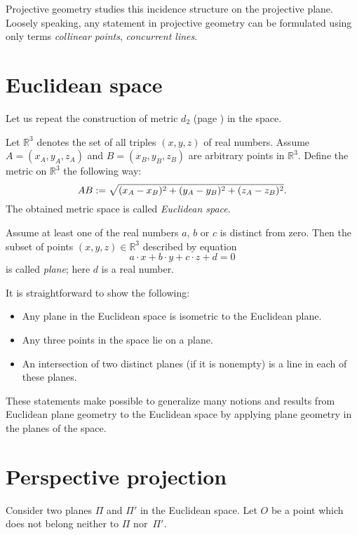 Projective geometry studies this incidence structure on the projective plane.
Loosely speaking, any statement in projective geometry can be formulated using only terms {}\emph{collinear points},
\emph{concurrent lines}.



\section*{Euclidean space}

Let us repeat the construction of metric $d_2$ (page 
\pageref{def:d_2}) in the space.

Let $\mathbb{R}^3$ denotes the set of all triples $(x,y,z)$ of real numbers.
Assume $A=(x_A,y_A,z_A)$ and $B=(x_B,y_B,z_B)$ are arbitrary points in $\mathbb{R}^3$.
Define the metric on $\mathbb{R}^3$ the following way:
$$AB
:=
\sqrt{(x_A-x_B)^2+(y_A-y_B)^2+(z_A-z_B)^2}.$$
The obtained metric space is called \emph{Euclidean space}.

Assume at least one of the real numbers $a$, $b$ or $c$ is distinct from zero.
Then the subset of points $(x,y,z)\in\mathbb{R}^3$ 
described by equation
$$a\cdot x+b\cdot y+c\cdot z+d=0$$ 
is called \emph{plane};
here $d$ is a real number.

It is straightforward to show the following:
\begin{itemize}
 \item Any plane in the Euclidean space is isometric to the Euclidean plane.
 \item Any three points in the space lie on a plane.
 \item An intersection of two distinct planes (if it is nonempty) is a line in each of these planes.
\end{itemize}

These statements make possible to generalize many notions and results from Euclidean plane geometry to the Euclidean space
by applying plane geometry in the planes of the space.

\section*{Perspective projection}

Consider two planes $\Pi$ and $\Pi'$ 
in the Euclidean space. 
Let $O$ be a point which does not belong neither to $\Pi$ nor~$\Pi'$.

